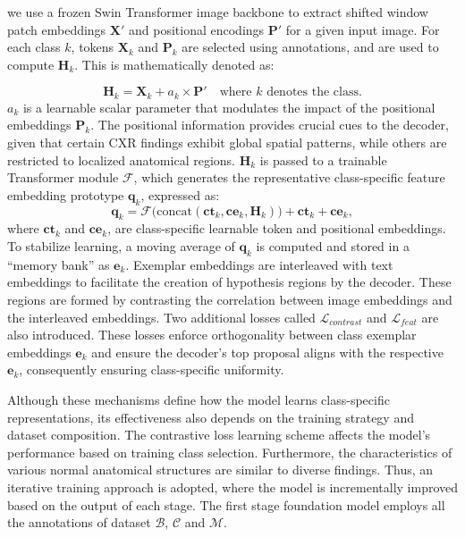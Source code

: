 \documentclass[runningheads]{llncs}
\begin{document}
we use a frozen Swin \cite{liu2021swin} Transformer image backbone to extract shifted window patch embeddings $\mathbf{X}'$ and positional encodings $\mathbf{P}'$ for a given input image. For each class $k$, tokens $\mathbf{X}_k$ and $\mathbf{P}_k$ are selected using annotations, and are used to compute $\mathbf{H}_k$. This is mathematically denoted as:

\begin{equation}
\mathbf{H}_k = \mathbf{X}_k + a_k \times \mathbf{P}'
\quad \text{where } k \text{ denotes the class.}
\label{eq:hk}
\end{equation}
$a_k$ is a learnable scalar parameter that modulates the impact of the positional embeddings $\mathbf{P}_k$. The positional information provides crucial cues to the decoder, given that certain CXR findings exhibit global spatial patterns, while others are restricted to localized anatomical regions. $\mathbf{H}_k$ is passed to a trainable Transformer module $\mathcal{F}$, which generates the representative class-specific feature embedding prototype $\mathbf{q}_k$, expressed as: 
\begin{equation}
\mathbf{q}_k = \mathcal{F}\big(\mathrm{concat}(\mathbf{ct}_k, \mathbf{ce}_k, \mathbf{H}_k)\big) + \mathbf{ct}_k + \mathbf{ce}_k, 
\label{eq:qk}
\end{equation}
where $\mathbf{ct}_k$ and $\mathbf{ce}_k$, are class-specific learnable token and positional embeddings. To stabilize learning, a moving average of $\mathbf{q}_k$ is computed and stored in a ``memory bank'' as $\mathbf{e}_k$. Exemplar embeddings are interleaved with text embeddings to facilitate the creation of hypothesis regions by the decoder. These regions are formed by contrasting the correlation between image embeddings and the interleaved embeddings. Two additional losses called $\mathcal{L}_{contrast}$ and $\mathcal{L}_{feat}$ are also introduced. These losses enforce orthogonality between class exemplar embeddings $\mathbf{e}_k$  and ensure the decoder's top proposal aligns with the respective $\mathbf{e}_k$, consequently ensuring class-specific uniformity.

Although these mechanisms define how the model learns class-specific representations, its effectiveness also depends on the training strategy and dataset composition. The contrastive loss learning scheme affects the model's performance based on training class selection. Furthermore, the characteristics of various normal anatomical structures are similar to diverse findings. Thus, an iterative training approach is adopted, where the model is incrementally improved based on the output of each stage. The first stage foundation model employs all the annotations of dataset $\mathcal{B}$, $\mathcal{C}$ and $\mathcal{M}$. 
\end{document}
